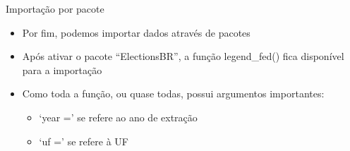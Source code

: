 \documentclass[
  10pt,
  ignorenonframetext,
]{beamer}
\providecommand{\tightlist}{%
  \setlength{\itemsep}{0pt}\setlength{\parskip}{0pt}}
\begin{document}
\begin{frame}{Importação por pacote}
\protect\hypertarget{importauxe7uxe3o-por-pacote}{}
\begin{itemize}
\tightlist
\item
  Por fim, podemos importar dados através de pacotes
\item
  Após ativar o pacote ``ElectionsBR'', a função legend\_fed() fica
  disponível para a importação
\item
  Como toda a função, ou quase todas, possui argumentos importantes:

  \begin{itemize}
  \tightlist
  \item
    `year =' se refere ao ano de extração
  \item
    `uf =' se refere à UF
  \end{itemize}
\end{itemize}
\end{frame}
\end{document}
